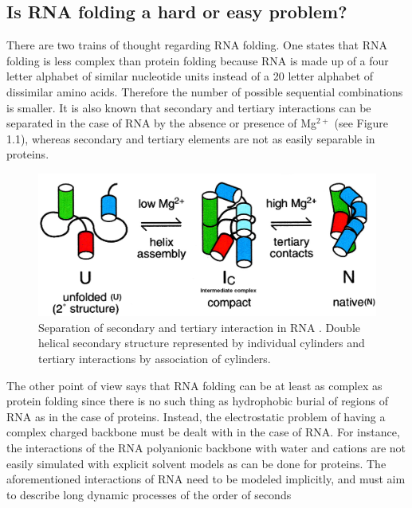 \subsection{Is RNA folding a hard or easy problem?}
There are two trains of thought regarding RNA folding. One states
that RNA folding is less complex than protein folding
\cite{tinoco1999} because RNA is made up of a four letter alphabet
of similar nucleotide units instead of a 20 letter alphabet of
dissimilar amino acids. Therefore the number of possible sequential
combinations is smaller. It is also known that secondary and
tertiary interactions can be separated in the case of RNA by the
absence or presence of Mg$^{2+}$ \cite{rangan2003} (see Figure 1.1),
whereas secondary and tertiary elements are not as easily separable in proteins.
\begin{figure}[ht]
\centering
\includegraphics[scale=0.3]{Chapter1/rangan2003pnas.png}
\caption{Separation of secondary and tertiary interaction in
RNA \cite{rangan2003}. Double helical secondary structure
represented  by individual cylinders and tertiary interactions by
association of cylinders.}
\end{figure}
The other point of view says that RNA folding can be at least as
complex as protein folding \cite{moore1999a, sorin2004} since there
is no such thing as hydrophobic burial of regions of RNA as in the
case of proteins. Instead, the electrostatic problem of having a
complex charged backbone must be dealt with in the case of RNA.
For instance, the interactions of the RNA polyanionic backbone with
water and cations \cite{klein2004a} are not easily simulated with
explicit solvent models as can be done for proteins. The
aforementioned interactions of RNA need to be modeled implicitly, and
must aim to describe long dynamic processes of the order of seconds
